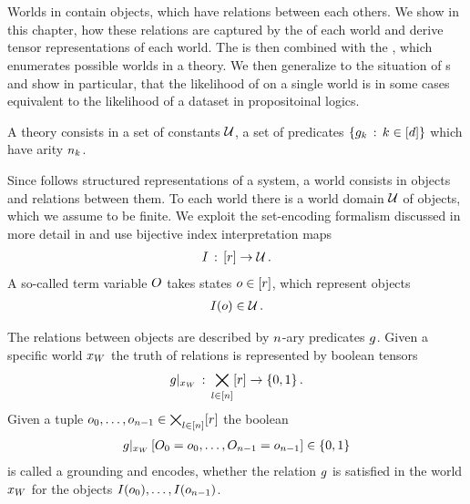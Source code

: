 \chapter{\chatextfolModels}\label{cha:folModels}

Worlds in \firstOrderLogic{} contain objects, which have relations between each others.
We show in this chapter, how these relations are captured by the \substitutionStructure{} of each world and derive tensor representations of each world.
The \substitutionStructure{} is then combined with the \semanticStructure{}, which enumerates possible worlds in a theory.
We then generalize \HybridLogicNetworks{} to the situation of \firstOrderLogic{}s and show in particular, that the likelihood of \HybridLogicNetworks{} on a single \firstOrderLogic{} world is in some cases equivalent to the likelihood of a dataset in propositoinal logics.





A \firstOrderLogic{} theory consists in a set of constants $\mathcal{U}$, a set of predicates $\{g_{k}\,:\,k\in[d]\}$ which have arity $n_{k}$.


Since \firstOrderLogic{} follows structured representations of a system, a \firstOrderLogic{} world consists in objects and relations between them.
To each world there is a world domain $\mathcal{U}$ of objects, which we assume to be finite. %
We exploit the set-encoding formalism discussed in more detail in  and use bijective index interpretation maps
\begin{align*}
    I \,:\, [r] \rightarrow \mathcal{U} \, .
\end{align*}
A so-called term variable $O$ takes states $o\in[r]$, which represent objects
\begin{align*}
    I(o) \in \mathcal{U} \, .
\end{align*}

%
The relations between objects are described by $n$-ary predicates $g$.
Given a specific world $x_{W}$ the truth of relations is represented by boolean tensors
\begin{align*}
    {g}|_{x_{W}} \,:\, \bigtimes_{l\in[n]}[r]\rightarrow\{0,1\} \, .
\end{align*}
Given a tuple $o_{0},\ldots,o_{n-1}\in\bigtimes_{l\in[n]}[r]$ the boolean
\begin{align*}
    {g}|_{x_{W}} \left[O_{0}=o_{0},\ldots,O_{n-1}=o_{n-1}\right] \in\{0,1\}
\end{align*}
is called a grounding and encodes, whether the relation $g$ is satisfied in the world $x_{W}$ for the objects $I(o_{0}),\ldots,I(o_{n-1})$.

